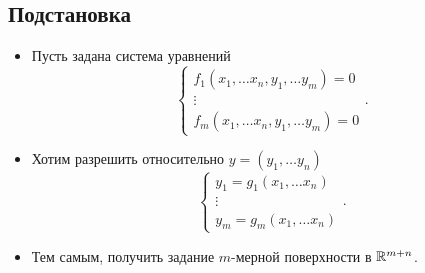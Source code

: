 \subsection{Подстановка}

\begin{itemize}
    \item Пусть задана система уравнений
	\[
	    \begin{cases}
		f_1(x_1, \ldots x_n, y_1, \ldots y_m) = 0 \\
		\vdots
		\\
		f_m(x_1, \ldots x_n, y_1, \ldots y_m) = 0
	    \end{cases}
	.\]
    \item  Хотим разрешить относительно $ y = (y_1, \ldots y_n)$
	\[
	    \begin{cases}
		y_1= g_1(x_1, \ldots x_{n})\\
		\vdots\\
		y_m = g_m(x_1, \ldots x_n)
	    \end{cases}
	.\]
    \item Тем самым, получить задание $ m$-мерной поверхности в   $ \mathbb{R}^{m+n}$.
\end{itemize}
